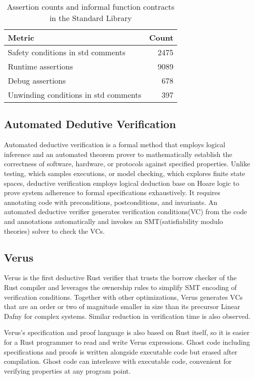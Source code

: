 \documentclass[conference]{IEEEtran}
\begin{document}
\begin{table}[htbp]
\centering
\begin{tabular}{l r}
\toprule
\textbf{Metric} & \textbf{Count} \\
\midrule
Safety conditions in std comments & 2475 \\
Runtime assertions & 9089 \\
Debug assertions & 678 \\
Unwinding conditions in std comments & 397 \\
\bottomrule
\end{tabular}
\caption{Assertion counts and informal function contracts in the Standard Library}
\label{tab:assertion_counts}
\end{table}

\subsection{Automated Dedutive Verification}
Automated deductive verification is a formal method that employs logical inference and an automated theorem prover to mathematically establish the correctness of software, hardware, or protocols against specified properties. Unlike testing, which samples executions, or model checking, which explores finite state spaces, deductive verification employs logical deduction base on Hoare logic to prove system adherence to formal specifications exhaustively. It requires annotating code with preconditions, postconditions, and invariants. An automated deductive verifier generates verification conditions(VC) from the code and annotations automatically and invokes an SMT(satisfiability modulo theories) solver to check the VCs.

\subsection{Verus}
Verus\cite{verus} is the first deductive Rust verifier that trusts the borrow checker of the Rust compiler and leverages the ownership rules to simplify SMT encoding of verification conditions. Together with other optimizations, Verus generates VCs that are an order or two of magnitude smaller\cite{VerifyingConcurrentSystemsCode} in size than its precursor Linear Dafny\cite{linearDafny} for complex systems. Similar reduction in verification time is also observed. 

Verus's specification and proof language is also based on Rust itself, so it is easier for a Rust programmer to read and write Verus expressions. Ghost code including specifications and proofs is written alongside executable code but erased after compilation. Ghost code can interleave with executable code, convenient for verifying properties at any program point.   
\end{document}
